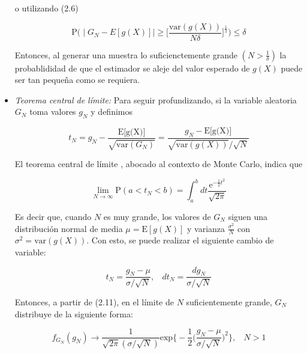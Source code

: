 \begin{itemize}
    o utilizando (2.6)
    
    \begin{equation}
        \text{P}\Bigg( \mid G_N - E[g(X)] \mid \geq \bigg[ \dfrac{\text{var}(g(X))}{N \delta} \bigg] ^{\frac{1}{2}} \Bigg) \leq \delta
    \end{equation}
    
    Entonces, al generar una muestra lo suficienctemente grande $(N > \frac{1}{\delta})$ la probablididad de que el estimador se aleje del valor esperado de $g(X)$ puede ser tan pequeña como se requiera.
    
    \item \textit{Teorema central de límite:}
    \newline
    Para seguir profundizando, si la variable aleatoria $G_N$ toma valores $g_N$ y definimos
    
    \begin{equation}
        t_N = g_N - \dfrac{\text{E[g(X)]}}{\sqrt{\text{var}(G_N)}} = \dfrac{g_N - \text{E[g(X)]}}{\sqrt{\text{var}(g(X))} / \sqrt{N}}
    \end{equation}
    
    El teorema central de límite \citep{fischer2010}, abocado al contexto de Monte Carlo, indica que
    
    \begin{equation}
        \lim_{N \rightarrow \infty} \text{P}(a < t_N < b) = \int_{a}^{b} dt \dfrac{\text{e}^{-\frac{1}{2}t^2}}{\sqrt{2\pi}}
    \end{equation}
    
    Es decir que, cuando $N$ es muy grande, los valores de $G_N$ siguen una distribución normal de media $\mu = \text{E}[g(X)]$ y varianza $\frac{\sigma^2}{N}$ con $\sigma^2 = \text{var}(g(X))$. Con esto, se puede realizar el siguiente cambio de variable:
    
    \begin{equation}
        t_N = \dfrac{g_N - \mu}{\sigma / \sqrt{N}}, ~~~~ dt_N = \dfrac{dg_N}{\sigma / \sqrt{N}}
    \end{equation}
    
    Entonces, a partir de (2.11), en el límite de $N$ suficientemente grande, $G_N$ distribuye de la siguiente forma:
    
    \begin{equation}
        f_{G_{N}} (g_{N}) \rightarrow \dfrac{1}{\sqrt{2\pi} (\sigma / \sqrt{N})} \text{exp} \Bigg\{-\dfrac{1}{2} \bigg( \dfrac{g_N - \mu}{\sigma / \sqrt{N}} \bigg)^2 \Bigg\}, ~~~~ N > 1
    \end{equation}
    

\end{itemize}
